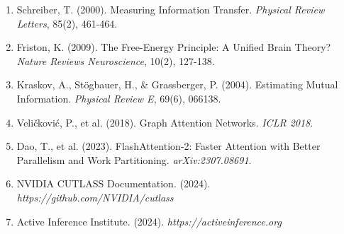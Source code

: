 \documentclass[11pt,letterpaper]{article}
\begin{document}
\begin{enumerate}
    \item Schreiber, T. (2000). Measuring Information Transfer. \textit{Physical Review Letters}, 85(2), 461-464.
    \item Friston, K. (2009). The Free-Energy Principle: A Unified Brain Theory? \textit{Nature Reviews Neuroscience}, 10(2), 127-138.
    \item Kraskov, A., Stögbauer, H., \& Grassberger, P. (2004). Estimating Mutual Information. \textit{Physical Review E}, 69(6), 066138.
    \item Veličković, P., et al. (2018). Graph Attention Networks. \textit{ICLR 2018}.
    \item Dao, T., et al. (2023). FlashAttention-2: Faster Attention with Better Parallelism and Work Partitioning. \textit{arXiv:2307.08691}.
    \item NVIDIA CUTLASS Documentation. (2024). \textit{https://github.com/NVIDIA/cutlass}
    \item Active Inference Institute. (2024). \textit{https://activeinference.org}
\end{enumerate}
\end{document}
